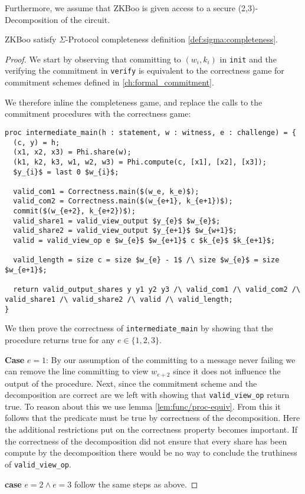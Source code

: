 Furthermore, we assume that ZKBoo is given access to a secure (2,3)-Decomposition of the circuit.

\begin{lemma}
  \label{lem:zkboo:correctness}
  ZKBoo satisfy $\Sigma$-Protocol completeness definition \ref{def:sigma:completeness}.
\end{lemma}
\begin{proof}
We start by observing that committing to $(w_{i}, k_{i})$ in \texttt{init} and
the verifying the commitment in \texttt{verify} is equivalent to the correctness
game for commitment schemes defined in \ref{ch:formal_commitment}.

We therefore inline the completeness game, and replace the calls to the
commitment procedures with the correctness game:

\begin{lstlisting}[mathescape, label=lst:zkboo-inter-completeness,caption=
Intermediate game for completeness]
proc intermediate_main(h : statement, w : witness, e : challenge) = {
  (c, y) = h;
  (x1, x2, x3) = Phi.share(w);
  (k1, k2, k3, w1, w2, w3) = Phi.compute(c, [x1], [x2], [x3]);
  $y_{i}$ = last 0 $w_{i}$;

  valid_com1 = Correctness.main($(w_e, k_e)$);
  valid_com2 = Correctness.main($(w_{e+1}, k_{e+1})$);
  commit($(w_{e+2}, k_{e+2})$);
  valid_share1 = valid_view_output $y_{e}$ $w_{e}$;
  valid_share2 = valid_view_output $y_{e+1}$ $w_{w+1}$;
  valid = valid_view_op e $w_{e}$ $w_{e+1}$ c $k_{e}$ $k_{e+1}$;

  valid_length = size c = size $w_{e} - 1$ /\ size $w_{e}$ = size $w_{e+1}$;

  return valid_output_shares y y1 y2 y3 /\ valid_com1 /\ valid_com2 /\ valid_share1 /\ valid_share2 /\ valid /\ valid_length;
}
\end{lstlisting}

We then prove the correctness of \texttt{intermediate\_main} by showing that
the procedure returns true for any $e \in \{1,2,3\}$.

\vspace{3mm}
\noindent
\textbf{Case} $e = 1$:
By our assumption of the committing to a message never failing we can remove the
line committing to view $w_{e+2}$ since it does not influence the output of the procedure.
Next, since the commitment scheme and the decomposition are correct are we left
with showing that \texttt{valid\_view\_op} return true. To reason about this we
use lemma \ref{lem:func/proc-equiv}. From this it follows that the predicate
must be true by correctness of the decomposition. Here the additional
restrictions put on the correctness property becomes important. If the
correctness of the decomposition did not ensure that every share has been
compute by the decomposition there would be no way to conclude the truthiness of \texttt{valid\_view\_op}.

\noindent\textbf{case} $e = 2 \land e = 3$ follow the same steps as above.
\end{proof}

